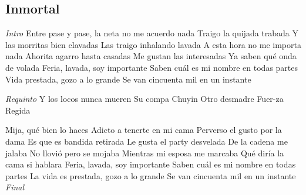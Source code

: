 \subsection{Inmortal}
\noindent

\vspace{1cm}

\begin{guitar}
	\begin{multicols}{2}
		\textit{Intro}
		Entre pase y pase, la neta no me acuerdo nada
	Traigo la quijada trabada
	Y las morritas bien clavadas
	Las traigo inhalando lavada
	A esta hora no me importa nada
	Ahorita agarro hasta casadas
	Me gustan las interesadas
	Ya saben qué onda de volada
	Feria, lavada, soy importante
	Saben cuál es mi nombre en todas partes
	Vida prestada, gozo a lo grande
	Se van cincuenta mil en un instante
	\par
	\textit{Requinto}
	Y los locos nunca mueren
	Su compa Chuyin
	Otro desmadre
	Fuer-za Regida
	\par
	Mija, qué bien lo haces
	Adicto a tenerte en mi cama
	Perverso el gusto por la dama
	Es que es bandida retirada
	Le gusta el party desvelada
	De la cadena me jalaba
	No llovió pero se mojaba
	Mientras mi esposa me marcaba
	Qué diría la cama si hablara
	Feria, lavada, soy importante
	Saben cuál es mi nombre en todas partes
	La vida es prestada, gozo a lo grande
	Se van cincuenta mil en un instante
		\textit{Final}
	\end{multicols}
\end{guitar}
